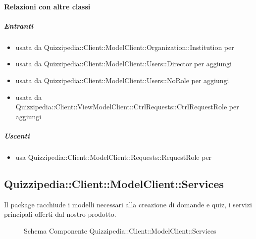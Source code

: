 \paragraph{Relazioni con altre classi}
\subparagraph{Entranti}
\begin{itemize}
\item usata da Quizzipedia::Client::ModelClient::Organization::Institution per 
\item usata da Quizzipedia::Client::ModelClient::Users::Director per aggiungi
\item usata da Quizzipedia::Client::ModelClient::Users::NoRole per aggiungi
\item usata da Quizzipedia::Client::ViewModelClient::CtrlRequests::CtrlRequestRole per aggiungi
\end{itemize}
\subparagraph{Uscenti}
\begin{itemize}
\item usa Quizzipedia::Client::ModelClient::Requests::RequestRole per 
\end{itemize}
\subsection{Quizzipedia::Client::ModelClient::Services}
Il package racchiude i modelli necessari alla creazione di domande e quiz, i servizi principali offerti dal nostro prodotto.
\begin{figure}[H]
\centering
\noindent{}
\caption[Schema Componente Quizzipedia::Client::ModelClient::Services]{Schema Componente Quizzipedia::Client::ModelClient::Services}
\end{figure}
